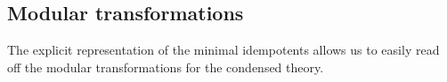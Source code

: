 \documentclass[12pt,a4paper]{article}
\newcommand{\mcc}{\mathcal{C}}
\newcommand{\tube}{\textbf{Tube}}
\begin{document}




\subsection{Modular transformations}
The explicit representation of the minimal idempotents allows us to easily read off the modular transformations for the condensed theory. 
\end{document}
